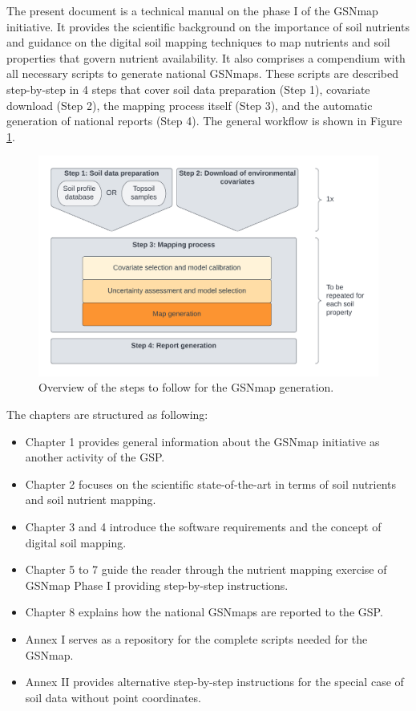 \documentclass[
  10pt,
  b5paper,
  oneside]{book}
\providecommand{\tightlist}{%
  \setlength{\itemsep}{0pt}\setlength{\parskip}{0pt}}
\begin{document}
The present document is a technical manual on the phase I of the GSNmap initiative. It provides the scientific background on the importance of soil nutrients and guidance on the digital soil mapping techniques to map nutrients and soil properties that govern nutrient availability. It also comprises a compendium with all necessary scripts to generate national GSNmaps. These scripts are described step-by-step in 4 steps that cover soil data preparation (Step 1), covariate download (Step 2), the mapping process itself (Step 3), and the automatic generation of national reports (Step 4). The general workflow is shown in Figure \ref{fig:steps}.

\begin{figure}
\includegraphics[width=28.12in]{images/Manual-Workflow} \caption{Overview of the steps to follow for the GSNmap generation.}\label{fig:steps}
\end{figure}

The chapters are structured as following:

\begin{itemize}
\tightlist
\item
  Chapter 1 provides general information about the GSNmap initiative as another activity of the GSP.
\item
  Chapter 2 focuses on the scientific state-of-the-art in terms of soil nutrients and soil nutrient mapping.
\item
  Chapter 3 and 4 introduce the software requirements and the concept of digital soil mapping.
\item
  Chapter 5 to 7 guide the reader through the nutrient mapping exercise of GSNmap Phase I providing step-by-step instructions.
\item
  Chapter 8 explains how the national GSNmaps are reported to the GSP.
\item
  Annex I serves as a repository for the complete scripts needed for the GSNmap.
\item
  Annex II provides alternative step-by-step instructions for the special case of soil data without point coordinates.
\end{itemize}
\end{document}
